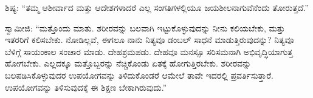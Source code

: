  ಶಿಷ್ಯ: “ತಮ್ಮ ಆಶೀರ್ವಾದ ಮತ್ತು ಆದೇಶಗಳಾದರೆ ಎಲ್ಲ ಸಂಗತಿಗಳಲ್ಲಿಯೂ ಜಯಶೀಲನಾಗುವೆನೆಂದು ತೋರುತ್ತದೆ.” 

 ಸ್ವಾಮೀಜಿ: “ಮತ್ತೊಂದು ಮಾತು. ಶರೀರವನ್ನು ಬಲವಾಗಿ ಇಟ್ಟುಕೊಳ್ಳುವುದನ್ನು ನೀನು ಕಲಿಯಬೇಕು, ಮತ್ತು ಇತರರಿಗೆ ಕಲಿಸಬೇಕು. ನೋಡಿಲ್ಲವೆ, ಈಗಲೂ ನಾನು ನಿತ್ಯವೂ ಡಂಬಲ್ ಸಾಧನೆ ಮಾಡುತ್ತಿರುವುದನ್ನು? ನಿತ್ಯವೂ ಬೆಳಿಗ್ಗೆ ಸಾಯಂಕಾಲ ಸಂಚಾರ ಮಾಡು. ದೇಹಶ್ರಮಪಡು. ದೇಹವೂ ಮನಸ್ಸೂ ಸರಿಸಮನಾಗಿ ಅಭಿವೃದ್ಧಿಯಾಗುತ್ತ ಹೋಗಬೇಕು. ಎಲ್ಲದಕ್ಕೂ ಮತ್ತೊಬ್ಬರನ್ನು ನೆಚ್ಚಿಕೊಂಡು ಏತಕ್ಕೆ ಹೋಗುತ್ತಿರಬೇಕು. ಶರೀರವನ್ನು ಬಲಪಡಿಸಿಕೊಳ್ಳುವುದರ ಉಪಯೋಗವನ್ನು ತಿಳಿದುಕೊಂಡರೆ ಆಮೇಲೆ ತಾವೇ ಇದರಲ್ಲಿ ಪ್ರವರ್ತಿಸುತ್ತಾರೆ. ಉಪಯೋಗವನ್ನು ತಿಳಿಸುವುದಕ್ಕೆ ಈ ಶಿಕ್ಷಣ ಬೇಕಾಗಿರುವುದು.” 

